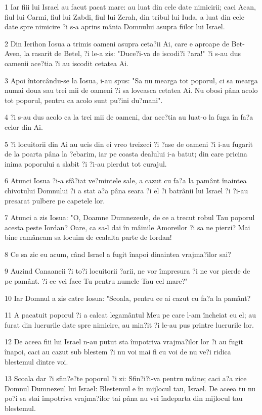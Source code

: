 \par 1 Iar fiii lui Israel au facut pacat mare: au luat din cele date nimicirii; caci Acan, fiul lui Carmi, fiul lui Zabdi, fiul lui Zerah, din tribul lui Iuda, a luat din cele date spre nimicire ?i s-a aprins mânia Domnului asupra fiilor lui Israel.
\par 2 Din Ierihon Iosua a trimis oameni asupra ceta?ii Ai, care e aproape de Bet-Aven, la rasarit de Betel, ?i le-a zis: "Duce?i-va de iscodi?i ?ara!" ?i s-au dus oamenii ace?tia ?i au iscodit cetatea Ai.
\par 3 Apoi întorcându-se la Iosua, i-au spus: "Sa nu mearga tot poporul, ci sa mearga numai doua sau trei mii de oameni ?i sa loveasca cetatea Ai. Nu obosi pâna acolo tot poporul, pentru ca acolo sunt pu?ini du?mani".
\par 4 ?i s-au dus acolo ca la trei mii de oameni, dar ace?tia au luat-o la fuga în fa?a celor din Ai.
\par 5 ?i locuitorii din Ai au ucis din ei vreo treizeci ?i ?ase de oameni ?i i-au fugarit de la poarta pâna la ?ebarim, iar pe coasta dealului i-a batut; din care pricina inima poporului a slabit ?i ?i-au pierdut tot curajul.
\par 6 Atunci Iosua ?i-a sfâ?iat ve?mintele sale, a cazut cu fa?a la pamânt înaintea chivotului Domnului ?i a stat a?a pâna seara ?i el ?i batrânii lui Israel ?i ?i-au presarat pulbere pe capetele lor.
\par 7 Atunci a zis Iosua: "O, Doamne Dumnezeule, de ce a trecut robul Tau poporul acesta peste Iordan? Oare, ca sa-l dai în mâinile Amoreilor ?i sa ne pierzi? Mai bine ramâneam sa locuim de cealalta parte de Iordan!
\par 8 Ce sa zic eu acum, când Israel a fugit înapoi dinaintea vrajma?ilor sai?
\par 9 Auzind Canaaneii ?i to?i locuitorii ?arii, ne vor împresura ?i ne vor pierde de pe pamânt. ?i ce vei face Tu pentru numele Tau cel mare?"
\par 10 Iar Domnul a zis catre Iosua: "Scoala, pentru ce ai cazut cu fa?a la pamânt?
\par 11 A pacatuit poporul ?i a calcat legamântul Meu pe care l-am încheiat cu el; au furat din lucrurile date spre nimicire, au min?it ?i le-au pus printre lucrurile lor.
\par 12 De aceea fiii lui Israel n-au putut sta împotriva vrajma?ilor lor ?i au fugit înapoi, caci au cazut sub blestem ?i nu voi mai fi cu voi de nu ve?i ridica blestemul dintre voi.
\par 13 Scoala dar ?i sfin?e?te poporul ?i zi: Sfin?i?i-va pentru mâine; caci a?a zice Domnul Dumnezeul lui Israel: Blestemul e în mijlocul tau, Israel. De aceea tu nu po?i sa stai împotriva vrajma?ilor tai pâna nu vei îndeparta din mijlocul tau blestemul.

